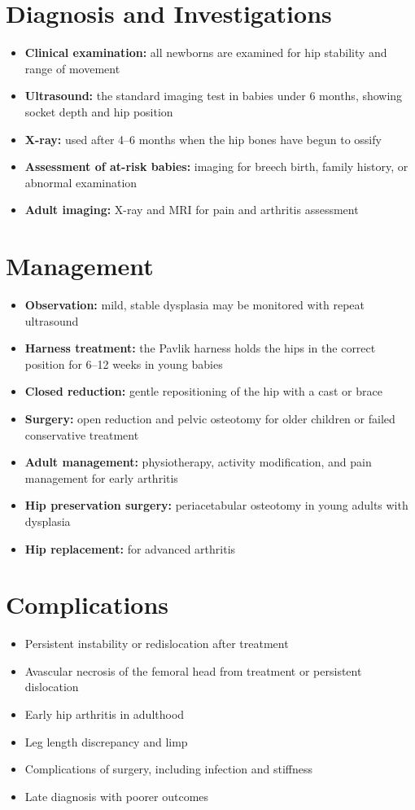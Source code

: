 \section*{Diagnosis and Investigations}
\begin{itemize}
    \item \textbf{Clinical examination:} all newborns are examined for hip stability and range of movement
    \item \textbf{Ultrasound:} the standard imaging test in babies under 6 months, showing socket depth and hip position
    \item \textbf{X-ray:} used after 4--6 months when the hip bones have begun to ossify
    \item \textbf{Assessment of at-risk babies:} imaging for breech birth, family history, or abnormal examination
    \item \textbf{Adult imaging:} X-ray and MRI for pain and arthritis assessment
\end{itemize}

\section*{Management}
\begin{itemize}
    \item \textbf{Observation:} mild, stable dysplasia may be monitored with repeat ultrasound
    \item \textbf{Harness treatment:} the Pavlik harness holds the hips in the correct position for 6--12 weeks in young babies
    \item \textbf{Closed reduction:} gentle repositioning of the hip with a cast or brace
    \item \textbf{Surgery:} open reduction and pelvic osteotomy for older children or failed conservative treatment
    \item \textbf{Adult management:} physiotherapy, activity modification, and pain management for early arthritis
    \item \textbf{Hip preservation surgery:} periacetabular osteotomy in young adults with dysplasia
    \item \textbf{Hip replacement:} for advanced arthritis
\end{itemize}

\section*{Complications}
\begin{itemize}
    \item Persistent instability or redislocation after treatment
    \item Avascular necrosis of the femoral head from treatment or persistent dislocation
    \item Early hip arthritis in adulthood
    \item Leg length discrepancy and limp
    \item Complications of surgery, including infection and stiffness
    \item Late diagnosis with poorer outcomes
\end{itemize}

